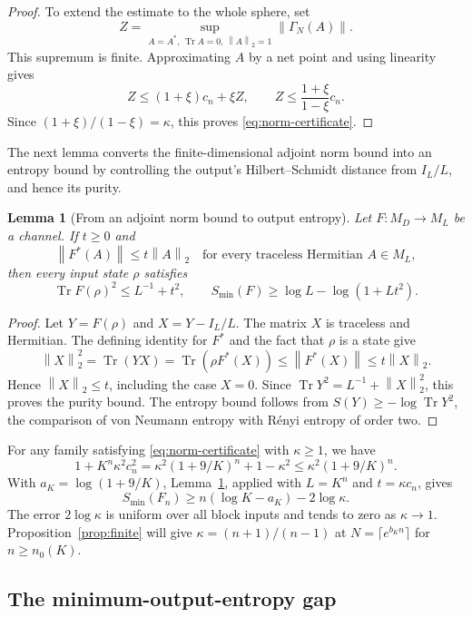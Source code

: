 \documentclass[11pt]{article}
\numberwithin{equation}{section}
\newtheorem{lemma}[theorem]{Lemma}
\theoremstyle{boldremark}\newtheorem{remark}[theorem]{Remark}
\DeclareMathOperator{\Tr}{Tr}
\newcommand{\M}{M}
\newcommand{\smin}{S_{\min}}
\newcommand{\norm}[1]{\left\lVert #1\right\rVert}
\begin{document}
\begin{proof}
To extend the estimate to the whole sphere, set
\[
 Z=\sup_{A=A^*,\,\Tr A=0,\,\norm A_2=1}\norm{\Gamma_N(A)}.
\]
This supremum is finite. Approximating $A$ by a net point and using
linearity gives
\[
 Z\le(1+\xi)c_n+\xi Z,
 \qquad Z\le\frac{1+\xi}{1-\xi}c_n.
\]
Since $(1+\xi)/(1-\xi)=\kappa$, this proves
\eqref{eq:norm-certificate}.
\end{proof}

The next lemma converts the finite-dimensional adjoint norm bound
into an entropy bound by controlling the output's Hilbert--Schmidt
distance from $I_L/L$, and hence its purity.

\begin{lemma}[From an adjoint norm bound to output entropy]\label{lem:purity}
Let $F:\M_D\to\M_L$ be a channel. If $t\ge0$ and
\[
 \norm{F^*(A)}\le t\norm A_2
 \quad\text{for every traceless Hermitian }A\in\M_L,
\]
then every input state $\rho$ satisfies
\begin{equation}
 \Tr F(\rho)^2\le L^{-1}+t^2,
 \qquad \smin(F)\ge\log L-\log(1+Lt^2).
 \label{eq:purity}
\end{equation}
\end{lemma}
\begin{proof}
Let $Y=F(\rho)$ and $X=Y-I_L/L$. The matrix $X$ is traceless and
Hermitian. The defining identity for $F^*$ and the fact that $\rho$ is a state give
\[
 \norm X_2^2=\Tr(YX)=\Tr(\rho F^*(X))
 \le\norm{F^*(X)}\le t\norm X_2.
\]
Hence $\norm X_2\le t$, including the case $X=0$. Since
$\Tr Y^2=L^{-1}+\norm X_2^2$, this proves the purity bound. The entropy
bound follows from $S(Y)\ge-\log\Tr Y^2$, the comparison of von Neumann
entropy with R\'enyi entropy of order two.
\end{proof}

For any family satisfying \eqref{eq:norm-certificate} with
$\kappa\ge1$, we have
\[
 1+K^n\kappa^2c_n^2
 =\kappa^2(1+9/K)^n+1-\kappa^2
 \le\kappa^2(1+9/K)^n.
\]
With $a_K=\log(1+9/K)$, Lemma~\ref{lem:purity}, applied
with $L=K^n$ and $t=\kappa c_n$, gives
\begin{equation}
 \smin(F_n)\ge n(\log K-a_K)-2\log\kappa.
 \label{eq:single-entropy}
\end{equation}
The error $2\log\kappa$ is uniform over all block inputs and tends to
zero as $\kappa\to1$. Proposition~\ref{prop:finite} will give
$\kappa=(n+1)/(n-1)$ at $N=\lceil e^{b_Kn}\rceil$ for
$n\ge n_0(K)$.

\subsection{The minimum-output-entropy gap}
\end{document}
